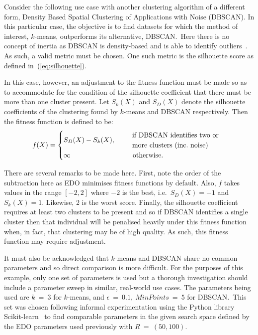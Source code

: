 Consider the following use case with another clustering algorithm of a different
form, Density Based Spatial Clustering of Applications with Noise (DBSCAN). In
this particular case, the objective is to find datasets for which the method of
interest, \(k\)-means, outperforms its alternative, DBSCAN.\ Here there is no
concept of inertia as DBSCAN is density-based and is able to identify
outliers~\cite{Ester1996}. As such, a valid metric must be chosen. One such
metric is the silhouette score as defined in~(\ref{eq:silhouette}).

In this case, however, an adjustment to the fitness function must be made so as
to accommodate for the condition of the silhouette coefficient that there must
be more than one cluster present. Let \(S_k (X)\) and \(S_D (X)\) denote the
silhouette coefficients of the clustering found by \(k\)-means and DBSCAN
respectively. Then the fitness function is defined to be:
\begin{equation}
    f(X) =
        \begin{cases}
            S_D (X) - S_k (X), &\quad \text{%
                \begin{tabular}{l}%
                    if DBSCAN identifies two or
                    \\
                    more clusters (inc.\ noise)
                \end{tabular}
            }\\
            \infty &\quad \ \ \text{otherwise.}
        \end{cases}\label{eq:dbscan-fitness}
\end{equation}

There are several remarks to be made here. First, note the order of the
subtraction here as EDO minimises fitness functions by default. Also, \(f\)
takes values in the range \([-2, 2]\) where \(-2\) is the best, i.e.\ \(S_D(X) =
-1\) and \(S_k(X) = 1\). Likewise, 2 is the worst score. Finally, the silhouette
coefficient requires at least two clusters to be present and so if DBSCAN
identifies a single cluster then that individual will be penalised heavily under
this fitness function when, in fact, that clustering may be of high quality. As
such, this fitness function may require adjustment.

It must also be acknowledged that \(k\)-means and DBSCAN share no common
parameters and so direct comparison is more difficult. For the purposes of this
example, only one set of parameters is used but a thorough investigation should
include a parameter sweep in similar, real-world use cases. The parameters being
used are \(k~=~3\) for \(k\)-means, and \(\epsilon~=~0.1,\ MinPoints~=~5\) for
DBSCAN.\ This set was chosen following informal experimentation using the Python
library Scikit-learn~\cite{scikit} to find comparable parameters in the given
search space defined by the EDO parameters used previously with
\(R~=~(50,100)\).

